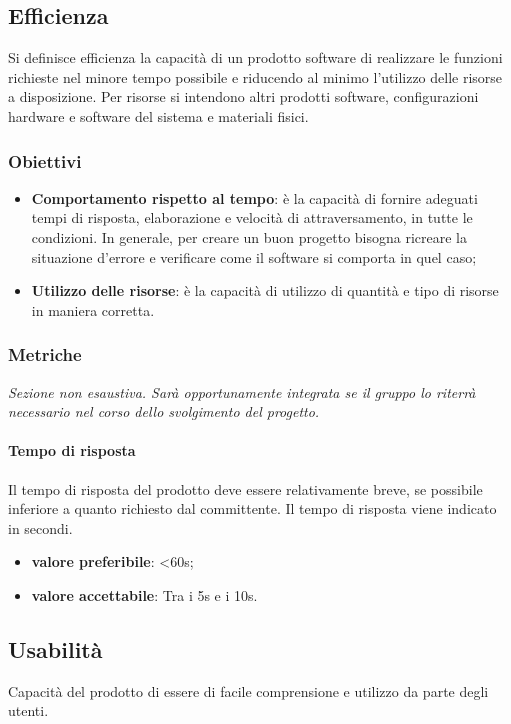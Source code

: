 \subsection{Efficienza}
Si definisce efficienza la capacità di un prodotto software di realizzare le funzioni richieste nel minore tempo possibile e riducendo al minimo l'utilizzo delle risorse a disposizione.
Per risorse si intendono altri prodotti software, configurazioni hardware e software del sistema e materiali fisici.
\subsubsection{Obiettivi}
\begin{itemize}
\item \textbf{Comportamento rispetto al tempo}: è la capacità di fornire adeguati tempi di risposta, elaborazione e velocità di attraversamento, in tutte le condizioni.
In generale, per creare un buon progetto bisogna ricreare la situazione d'errore e verificare come il software si comporta in quel caso;
\item \textbf{Utilizzo delle risorse}: è la capacità di utilizzo di quantità e tipo di risorse in maniera corretta.
\end{itemize}

\subsubsection{Metriche}
\textit{Sezione non esaustiva. Sarà opportunamente integrata se il gruppo lo riterrà necessario nel corso dello svolgimento del progetto.}

\paragraph{Tempo di risposta}
Il tempo di risposta del prodotto deve essere relativamente breve, se possibile inferiore a quanto richiesto dal committente. Il tempo di risposta viene indicato in secondi.
\begin{itemize}
\item \textbf{valore preferibile}: <60s;
\item \textbf{valore accettabile}: Tra i 5s e i 10s.
\end{itemize}

\subsection{Usabilità}
Capacità del prodotto di essere di facile comprensione e utilizzo da parte degli utenti.
